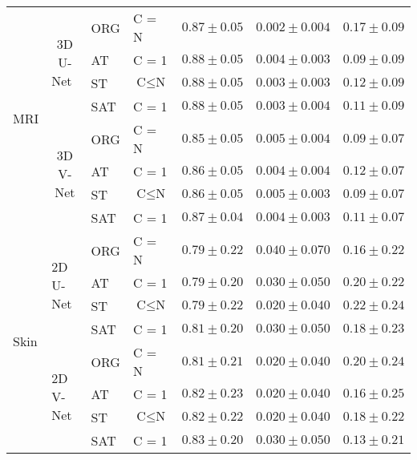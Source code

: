 \documentclass{article}
\begin{document}
\begin{table}
\begin{tabular}{lcllccc}
\multirow{8}{*}{MRI} & \multirow{4}{*}{3D U-Net~\cite{cciccek20163d}} & ORG & C = N & $0.87\pm0.05$ & $0.002\pm0.004$ & $0.17\pm0.09$ \\
 &  & AT & C = 1 & $0.88\pm0.05$ & $0.004\pm0.003$ & $0.09\pm0.09$ \\
 &  & ST & $\text{C} \leqslant \text{N}$ & $0.88\pm0.05$ & $0.003\pm0.003$ & $0.12\pm0.09$ \\
 &  & SAT & C = 1 & $0.88\pm0.05$ & $0.003\pm0.004$ & $0.11\pm0.09$ \\ \cline{2-7}
 & \multirow{4}{*}{3D V-Net\cite{milletari2016v}} & ORG & C = N & $0.85\pm0.05$ & $0.005\pm0.004$ & $0.09\pm0.07$ \\
 &  & AT & C = 1 & $0.86\pm0.05$ & $0.004\pm0.004$ & $0.12\pm0.07$ \\
 &  & ST & $\text{C} \leqslant \text{N}$ & $0.86\pm0.05$ & $0.005\pm0.003$ & $0.09\pm0.07$ \\
 &  & SAT & C = 1 & $0.87\pm0.04$ & $0.004\pm0.003$ & $0.11\pm0.07$ \\ \hline
\multirow{8}{*}{Skin} & \multicolumn{1}{l}{\multirow{4}{*}{2D U-Net~\cite{ronneberger2015u}}} & ORG & C = N & \multicolumn{1}{l}{$0.79\pm0.22$} & \multicolumn{1}{l}{$0.040\pm0.070$} & \multicolumn{1}{l}{$0.16\pm0.22$} \\
 & \multicolumn{1}{l}{} & AT & C = 1 & \multicolumn{1}{l}{$0.79\pm0.20$} & \multicolumn{1}{l}{$0.030\pm0.050$} & \multicolumn{1}{l}{$0.20\pm0.22$} \\
 & \multicolumn{1}{l}{} & ST & $\text{C} \leqslant \text{N}$ & \multicolumn{1}{l}{$0.79\pm0.22$} & \multicolumn{1}{l}{$0.020\pm0.040$} & \multicolumn{1}{l}{$0.22\pm0.24$} \\
 & \multicolumn{1}{l}{} & SAT & C = 1 & \multicolumn{1}{l}{$0.81\pm0.20$} & \multicolumn{1}{l}{$0.030\pm0.050$} & \multicolumn{1}{l}{$0.18\pm0.23$} \\ \cline{2-7}
 & \multicolumn{1}{l}{\multirow{4}{*}{2D V-Net}} & ORG & C = N & \multicolumn{1}{l}{$0.81\pm0.21$} & \multicolumn{1}{l}{$0.020\pm0.040$} & \multicolumn{1}{l}{$0.20\pm0.24$} \\
 & \multicolumn{1}{l}{} & AT & C = 1 & \multicolumn{1}{l}{$0.82\pm0.23$} & \multicolumn{1}{l}{$0.020\pm0.040$} & \multicolumn{1}{l}{$0.16\pm0.25$} \\
 & \multicolumn{1}{l}{} & ST & $\text{C} \leqslant \text{N}$ & \multicolumn{1}{l}{$0.82\pm0.22$} & \multicolumn{1}{l}{$0.020\pm0.040$} & \multicolumn{1}{l}{$0.18\pm0.22$} \\
 & \multicolumn{1}{l}{} & SAT & C = 1 & \multicolumn{1}{l}{$0.83\pm0.20$} & \multicolumn{1}{l}{$0.030\pm0.050$} & \multicolumn{1}{l}{$0.13\pm0.21$} \\ \hline
\end{tabular}
\end{table}
\end{document}
